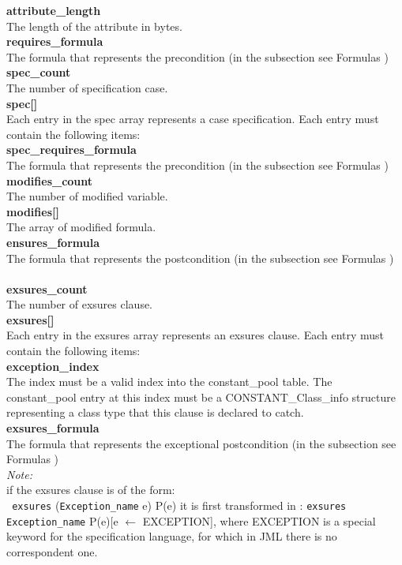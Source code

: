 \begin{appendix}
\textbf{   attribute\_length}\\
   The length of the attribute in bytes.\\

\textbf{   requires\_formula} \\
   The formula that represents the precondition (in the subsection see Formulas )\\

\textbf{   spec\_count} \\
   The number of specification case.\\

\textbf{   spec[]} \\
   Each entry in the spec array represents a case specification. Each entry must contain the following items:\\

\textbf{   spec\_requires\_formula} \\
   The formula that represents the precondition (in the subsection see Formulas )\\

\textbf{   modifies\_count} \\
   The number of modified variable.\\

\textbf{   modifies[]} \\
   The array of modified formula.\\

\textbf{  ensures\_formula } \\
   The formula that represents the postcondition (in the subsection see Formulas )\\\\

\textbf{   exsures\_count} \\
   The number of exsures clause.\\

\textbf{   exsures[] } \\
   Each entry in the exsures array represents an exsures clause. Each entry must contain the following items:\\

\textbf{   exception\_index} \\
   The index must be a valid index into the constant\_pool table. The constant\_pool entry at this index must be a CONSTANT\_Class\_info structure representing a class type that this clause is declared to catch.\\

\textbf{  exsures\_formula } \\
   The formula that represents the exceptional postcondition (in the subsection see Formulas )\\
\textit{Note:}\\
if the exsures clause is of the form: \\  
\texttt{ exsures} (\texttt{Exception\_name}  e) P(e) 
it is first  transformed in : 
\texttt{exsures} \texttt{Exception\_name} P(e)[e $\leftarrow$ \textrm{EXCEPTION}], 
where \textrm{ EXCEPTION} is a special keyword for the specification language, for which in JML there is no correspondent one.


\end{appendix}
